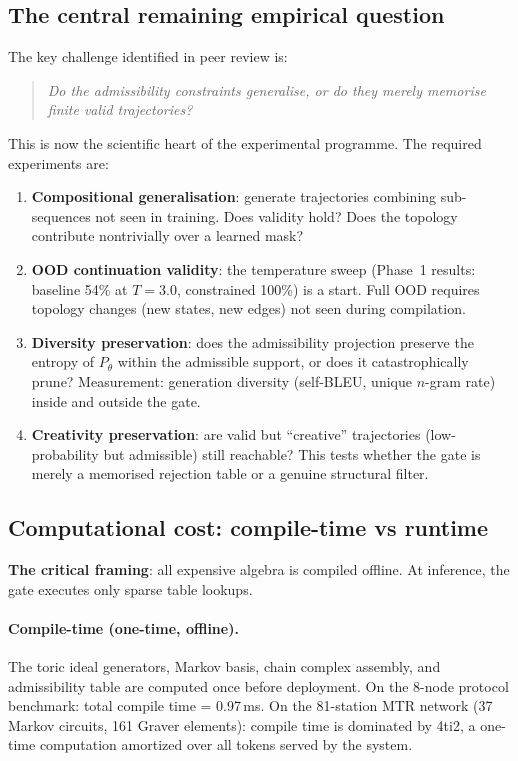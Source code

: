 \documentclass[11pt,a4paper]{article}
\begin{document}
\subsection{The central remaining empirical question}

The key challenge identified in peer review is:

\begin{quote}
\emph{Do the admissibility constraints generalise, or do they
merely memorise finite valid trajectories?}
\end{quote}

This is now the scientific heart of the experimental programme.
The required experiments are:
\begin{enumerate}[label=(\roman*)]
  \item \textbf{Compositional generalisation}: generate trajectories
        combining sub-sequences not seen in training.
        Does validity hold? Does the topology contribute nontrivially
        over a learned mask?
  \item \textbf{OOD continuation validity}: the temperature sweep
        (Phase~1 results: baseline 54\% at $T=3.0$, constrained
        100\%) is a start. Full OOD requires topology changes
        (new states, new edges) not seen during compilation.
  \item \textbf{Diversity preservation}: does the admissibility
        projection preserve the entropy of $P_\theta$ within the
        admissible support, or does it catastrophically prune?
        Measurement: generation diversity (self-BLEU, unique
        $n$-gram rate) inside and outside the gate.
  \item \textbf{Creativity preservation}: are valid but
        ``creative'' trajectories (low-probability but admissible)
        still reachable? This tests whether the gate is merely
        a memorised rejection table or a genuine structural filter.
\end{enumerate}

\subsection{Computational cost: compile-time vs runtime}

\textbf{The critical framing}: all expensive algebra is compiled offline.
At inference, the gate executes only sparse table lookups.

\paragraph{Compile-time (one-time, offline).}
The toric ideal generators, Markov basis, chain complex assembly,
and admissibility table are computed once before deployment.
On the 8-node protocol benchmark: total compile time = 0.97\,ms.
On the 81-station MTR network (37 Markov circuits, 161 Graver elements):
compile time is dominated by 4ti2, a one-time computation amortized
over all tokens served by the system.
\end{document}
